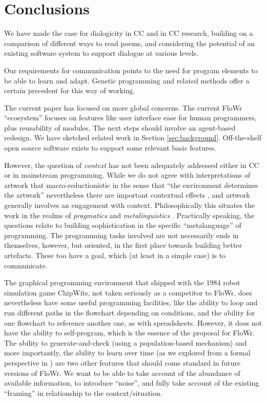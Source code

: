\section{Conclusions}
\label{sec:conc}

We have made the case for dialogicity in CC and in CC research,
building on a comparison of different ways to read poems, and
considering the potential of an existing software system to support
dialogue at various levels.

Our requirements for communication points to the need for program
elements to be able to learn and adapt.  Genetic programming
\cite{koza1992genetic} and related methods offer a certain precedent
for this way of working.

The current paper has focused on more global concerns.  The current
FloWr ``ecosystem'' focuses on features like user interface ease for
human programmers, plus reusability of modules.  The next steps should
involve an agent-based redesign.  We have sketched related work in
Section \ref{sec:background}.  Off-the-shelf open source software
exists to support some relevant basic features.

However, the question of \emph{context} has not been adequately
addressed either in CC or in mainstream programming.  While we do not
agree with interpretations of artwork that macro-reductionistic in the
sense that ``the environment determines the artwork'' nevertheless
there are important contextual effects \cite{geertz1976art}, and
artwork generally involves an engagement with context.
Philosophically this situates the work in the realms of
\emph{pragmatics} \cite{sep-pragmatics} and \emph{metalinguistics}
\cite{gombert1994development}.  Practically speaking, the questions
relate to building sophistication in the specific ``metalanguage'' of
programming.  The programming tasks involved are not necessarily ends
in themselves, however, but oriented, in the first place towards
building better artefacts.  These too have a goal, which (at least in
a simple case) is to communicate.

The graphical programming environment that shipped with the 1984 robot
simulation game ChipWits, not taken seriously as a competitor to
FloWr, does nevertheless have some useful programming facilities, like
the ability to loop and run different paths in the flowchart depending
on conditions, and the ability for one flowchart to reference another
one, as with spreadsheets.  However, it does not have the ability to
self-program, which is the essence of the proposal for FloWr.  The
ability to generate-and-check (using a population-based mechanism) and
more importantly, the ability to learn over time (as we explored from
a formal perspective in \cite{colton-assessingprogress}) are two other
features that should come standard in future versions of FloWr.  We
want to be able to take account of the abundance of available
information, to introduce ``noise'', and fully take account of the
existing ``framing'' in relationship to the context/situation.

